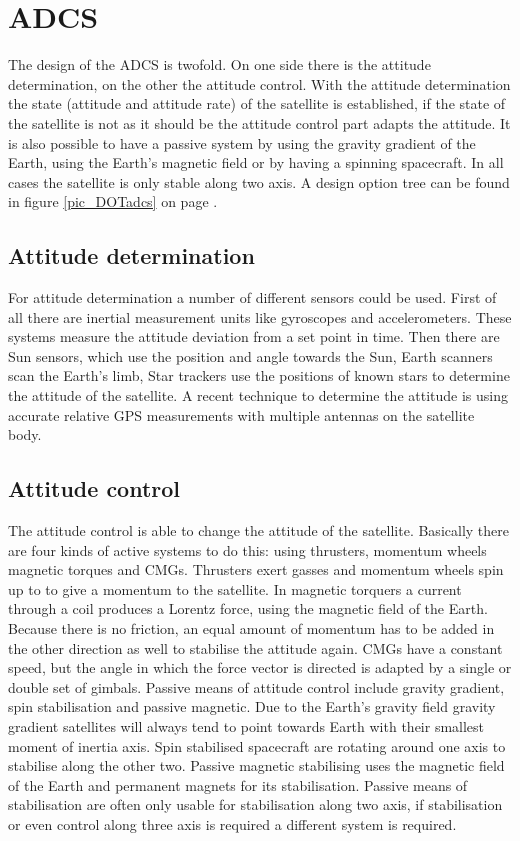 \section{ADCS}
The design of the \ac{ADCS} is twofold. On one side there is the attitude determination, on the other the attitude control. With the attitude determination the state (attitude and attitude rate) of the satellite is established, if the state of the satellite is not as it should be the attitude control part adapts the attitude. It is also possible to have a passive system by using the gravity gradient of the Earth, using the Earth's magnetic field or by having a spinning spacecraft. In all cases the satellite is only stable along two axis. A design option tree can be found in figure \ref{pic_DOTadcs} on page \pageref{pic_DOTadcs}.

\subsection{Attitude determination}
For attitude determination a number of different sensors could be used. First of all there are inertial measurement units like gyroscopes and accelerometers. These systems measure the attitude deviation from a set point in time. Then there are Sun sensors, which use the position and angle towards the Sun,  Earth scanners scan the Earth's limb, Star trackers use the positions of known stars to determine the attitude of the satellite. A recent technique to determine the attitude is using accurate relative \ac{GPS} measurements with multiple antennas on the satellite body.

\subsection{Attitude control}
The attitude control is able to change the attitude of the satellite. Basically there are four kinds of active systems to do this: using thrusters, momentum wheels magnetic torques and \acp{CMG}. Thrusters exert gasses and momentum wheels spin up to to give a momentum to the satellite. In magnetic torquers a current through a coil produces a Lorentz force, using the magnetic field of the Earth. Because there is no friction, an equal amount of momentum has to be added in the other direction as well to stabilise the attitude again. \ac{CMG}s have a constant speed, but the angle in which the force vector is directed is adapted by a single or double set of gimbals. Passive means of attitude control include gravity gradient, spin stabilisation and passive magnetic. Due to the Earth's gravity field gravity gradient satellites will always tend to point towards Earth with their smallest moment of inertia axis. Spin stabilised spacecraft are rotating around one axis to stabilise along the other two. Passive magnetic stabilising uses the magnetic field of the Earth and permanent magnets for its stabilisation. Passive means of stabilisation are often only usable for stabilisation along two axis, if stabilisation or even control along three axis is required a different system is required.

